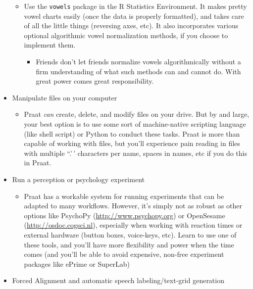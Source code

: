 \begin{itemize}
  \begin{itemize}
  \tightlist
  \item
    Use the \texttt{vowels} package in the R Statistics Environment. It
    makes pretty vowel charts easily (once the data is properly
    formatted), and takes care of all the little things (reversing axes,
    etc). It also incorporates various optional algorithmic vowel
    normalization methods, if you choose to implement them.

    \begin{itemize}
    \tightlist
    \item
      Friends don't let friends normalize vowels algorithmically without
      a firm understanding of what such methods can and cannot do. With
      great power comes great responsibility.
    \end{itemize}
  \end{itemize}
\item
  Manipulate files on your computer

  \begin{itemize}
  \tightlist
  \item
    Praat \emph{can} create, delete, and modify files on your drive. But
    by and large, your best option is to use some sort of machine-native
    scripting language (like shell script) or Python to conduct these
    tasks. Praat is more than capable of working with files, but you'll
    experience pain reading in files with multiple ``.'\,' characters
    per name, spaces in names, etc if you do this in Praat.
  \end{itemize}
\item
  Run a perception or psychology experiment

  \begin{itemize}
  \tightlist
  \item
    Praat has a workable system for running experiments that can be
    adapted to many workflows. However, it's simply not as robust as
    other options like PsychoPy (\url{http://www.psychopy.org}) or
    OpenSesame (\url{http://osdoc.cogsci.nl}), especially when working
    with reaction times or external hardware (button boxes, voice-keys,
    etc). Learn to use one of these tools, and you'll have more
    flexibility and power when the time comes (and you'll be able to
    avoid expensive, non-free experiment packages like ePrime or
    SuperLab)
  \end{itemize}
\item
  Forced Alignment and automatic speech labeling/text-grid generation


\end{itemize}

